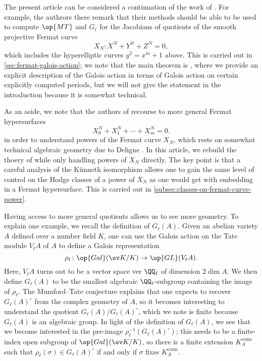 \documentclass[openany]{book}
\begin{document}
The present article can be considered a continuation of the work of \cite{ggl-fermat}. For example, the authrors there remark that their methods should be able to be used to compute $\op{MT}$ and $G_\ell$ for the Jacobians of quotients of the smooth projective Fermat curve
\[X_N\colon X^N+Y^N+Z^N=0,\]
which includes the hyperelliptic curves $y^2=x^m+1$ above. This is carried out in \cref{sec:fermat-galois-action}; we note that the main theorem is , where we provide an explicit description of the Galois action in terms of Galois action on certain explicitly computed periods, but we will not give the statement in the introduction because it is somewhat technical.
\begin{remark}
	As an aside, we note that the authors of \cite{ggl-fermat} recourse to more general Fermat hypersurfaces
	\[X_0^N+X_1^N+\cdots+X_m^N=0.\]
	in order to understand powers of the Fermat curve $X_N$, which rests on somewhat technical algebraic geometry due to Deligne \cite[Section~7]{deligne-hodge}. In this article, we rebuild the thoery of \cite{ggl-fermat} while only handling powers of $X_N$ directly. The key point is that a careful analysis of the K\"unneth isomorphism allows one to gain the same level of control on the Hodge classes of a power of $X_N$ as one would get with embedding in a Fermat hypersurface. This is carried out in \cref{subsec:classes-on-fermat-curve-power}.
\end{remark}
Having access to more general quotients allows us to see more geometry. To explain one example, we recall the definition of $G_\ell(A)$. Given an abelian variety $A$ defined over a number field $K$, one can use the Galois action on the Tate module $V_\ell A$ of $A$ to define a Galois representation
\[\rho_\ell\colon\op{Gal}(\ov K/K)\to\op{GL}(V_\ell A).\]
Here, $V_\ell A$ turns out to be a vector space ver $\QQ_\ell$ of dimension $2\dim A$. We then define $G_\ell(A)$ to be the smallest algebraic $\QQ_\ell$-subgroup containing the image of $\rho_\ell$. The Mumford--Tate conjecture explains that one expects to recover $G_\ell(A)^\circ$ from the complex geometry of $A$, so it becomes interesting to understand the quotient $G_\ell(A)/G_\ell(A)^\circ$, which we note is finite because $G_\ell(A)$ is an algebraic group. In light of the definition of $G_\ell(A)$, we see that we become interested in the pre-image $\rho_\ell^{-1}(G_\ell(A)^\circ)$; this needs to be a finite-index open subgroup of $\op{Gal}(\ov K/K)$, so there is a finite extension $K_A^{\mathrm{conn}}$ such that $\rho_\ell(\sigma)\in G_\ell(A)^\circ$ if and only if $\sigma$ fixes $K_A^{\mathrm{conn}}$.
\end{document}
